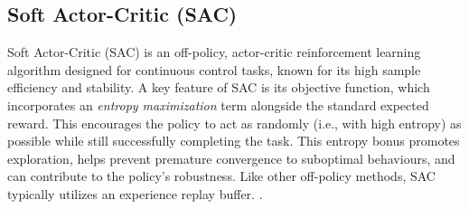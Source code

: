 \documentclass[12pt, a4paper]{article} %
\begin{document}
\subsection{Soft Actor-Critic (SAC)}
\label{def:sac} %

Soft Actor-Critic (SAC) \citep{haarnoja2018soft} is an off-policy, actor-critic reinforcement learning algorithm designed for continuous control tasks, known for its high sample efficiency and stability. A key feature of SAC is its objective function, which incorporates an \textit{entropy maximization} term alongside the standard expected reward. This encourages the policy to act as randomly (i.e., with high entropy) as possible while still successfully completing the task. This entropy bonus promotes exploration, helps prevent premature convergence to suboptimal behaviours, and can contribute to the policy's robustness. Like other off-policy methods, SAC typically utilizes an experience replay buffer. \citep[e.g., benchmarked in][]{glossop2022characterising}.


\newpage %

\end{document}
